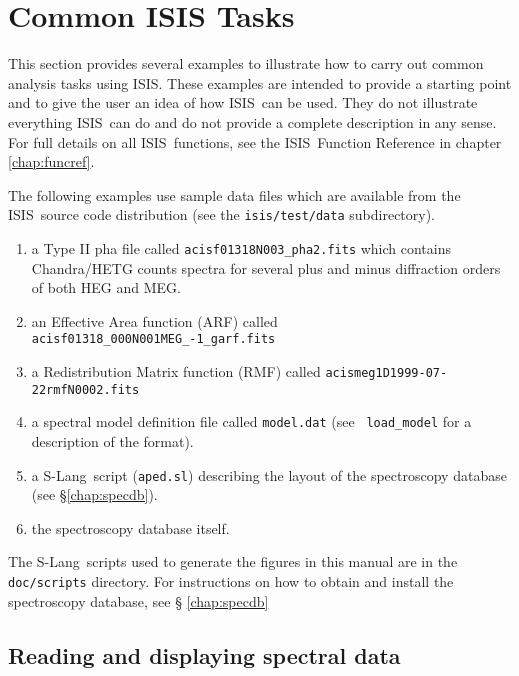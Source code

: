 \documentclass{book}
\newcommand{\isisx}{{\sc ISIS~}}
\newcommand{\isis}{{\sc ISIS}}
\newcommand{\slang}{{\sc S-Lang}}
\begin{document}
\chapter{Common ISIS Tasks}
\label{chap:common-tasks}

This section provides several examples to illustrate how to carry out common
analysis tasks using \isis.  These examples are intended to provide a
starting point and to give the user an idea of how \isisx can be used.  They
do not illustrate everything \isisx can do and do not provide a complete
description in any sense.  For full details on all \isisx functions, see the
\isisx Function Reference in chapter \ref{chap:funcref}.

The following examples use sample data files which are
available from the \isisx source code distribution (see the
\verb|isis/test/data| subdirectory).
\begin{enumerate}

\item a Type II pha file called \verb|acisf01318N003_pha2.fits|
which contains Chandra/HETG counts spectra for several plus and
minus diffraction orders of both HEG and MEG.

\item an Effective Area function (ARF) called
\verb|acisf01318_000N001MEG_-1_garf.fits|

\item a Redistribution Matrix function (RMF) called
\verb|acismeg1D1999-07-22rmfN0002.fits|

\item a spectral model definition file called {\tt model.dat} (see {\tt
load\_model} for a description of the format).

\item a \slang{}ript ({\tt aped.sl}) describing the layout of the
spectroscopy database (see \S\ref{chap:specdb}).

\item the spectroscopy database itself.
\end{enumerate}

The \slang{}ripts used to generate the figures in this manual
are in the {\tt doc/scripts} directory. For instructions on
how to obtain and install the spectroscopy database, see \S
\ref{chap:specdb}

\section{Reading and displaying spectral data}
\end{document}
